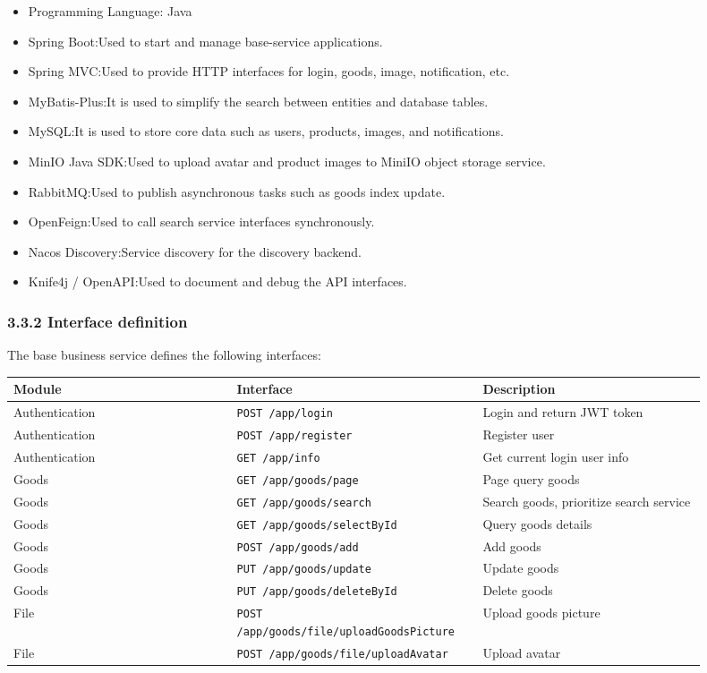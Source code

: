 \documentclass{article}
\begin{document}
\begin{itemize}
    \item Programming Language: Java
    \item Spring Boot:Used to start and manage base-service applications.
    \item Spring MVC:Used to provide HTTP interfaces for login, goods, image, notification, etc.
    \item MyBatis-Plus:It is used to simplify the search between entities and database tables.
    \item MySQL:It is used to store core data such as users, products, images, and notifications.
    \item MinIO Java SDK:Used to upload avatar and product images to MiniIO object storage service.
    \item RabbitMQ:Used to publish asynchronous tasks such as goods index update.
    \item OpenFeign:Used to call search service interfaces synchronously.
    \item Nacos Discovery:Service discovery for the discovery backend.
    \item Knife4j / OpenAPI:Used to document and debug the API interfaces.
\end{itemize}

\subsubsection{3.3.2 Interface definition}

The base business service defines the following interfaces:

\begin{longtable}{p{0.30\linewidth}p{0.30\linewidth}p{0.30\linewidth}}
\toprule
\textbf{Module} & \textbf{Interface} & \textbf{Description} \\
\midrule
Authentication & \texttt{POST /app/login} & Login and return JWT token \\
Authentication & \texttt{POST /app/register} & Register user \\
Authentication & \texttt{GET /app/info} & Get current login user info \\
Goods & \texttt{GET /app/goods/page} & Page query goods \\
Goods & \texttt{GET /app/goods/search} & Search goods, prioritize search service \\
Goods & \texttt{GET /app/goods/selectById} & Query goods details \\
Goods & \texttt{POST /app/goods/add} & Add goods \\
Goods & \texttt{PUT /app/goods/update} & Update goods \\
Goods & \texttt{PUT /app/goods/deleteById} & Delete goods \\
File & \texttt{POST /app/goods/file/uploadGoodsPicture} & Upload goods picture \\
File & \texttt{POST /app/goods/file/uploadAvatar} & Upload avatar \\
\bottomrule
\end{longtable}
\end{document}
